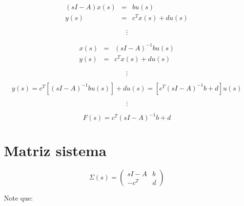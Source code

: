         \begin{eqnarray}
        (s I - A) x(s) & = & b u(s) \nonumber \\
        y(s) & = & c^T x(s) + d u(s) \nonumber
        \end{eqnarray}

        \begin{equation}
            \vdots \nonumber
        \end{equation}

        \begin{eqnarray}
        x(s) & = & (s I - A)^{-1} b u(s) \nonumber \\
        y(s) & = & c^T x(s) + d u(s) \nonumber
        \end{eqnarray}

        \begin{equation}
            \vdots \nonumber
        \end{equation}

        \begin{equation}
            y(s) = c^T[(s I - A)^{-1} b u(s)] + d u(s) = [c^T(s I - A)^{-1} b + d] u(s) \nonumber
        \end{equation}

        \begin{equation}
            \vdots \nonumber
        \end{equation}

        \begin{equation}
            F(s) = c^T(s I - A)^{-1} b + d
        \end{equation}

    \section{Matriz sistema}

        \begin{equation}
            \Sigma(s) =
            \begin{pmatrix}
            sI - A & b \\
            -c^T & d
            \end{pmatrix}
        \end{equation}

        Note que:

